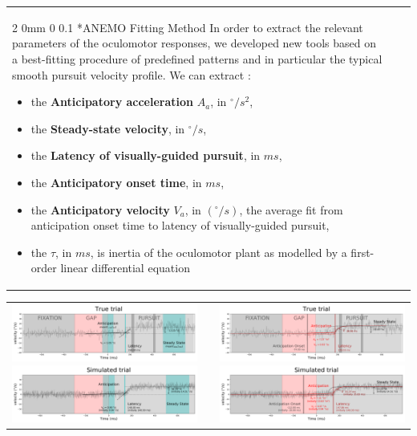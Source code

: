 \documentclass[profile,final,english, draft]{sciposter}%
\makeatletter
\renewcommand{\subsection}{\@startsection
        {subsection}%
        {2}%
        {0mm}%
        {0\baselineskip}%
        {0.1\baselineskip}%
        {\Large\color[rgb]{0.4,0,0}\bfseries}}%
\newcommand{\spacefig}{1.\baselineskip}
\makeatother
\begin{document}
\begin{tabular}{p{}m{}p{}}
\subsection*{ANEMO Fitting Method}
In order to extract the relevant parameters of the oculomotor responses, we developed new tools based on a best-fitting procedure of predefined patterns and in particular the typical smooth pursuit velocity profile. We can extract :
\begin{itemize}%
\item the \textbf{Anticipatory acceleration} $A_a$, in $^\circ/s^2$,
\item the \textbf{Steady-state velocity}, in $^\circ/s$,
\item the \textbf{Latency of visually-guided pursuit}, in $ms$,
\item the \textbf{Anticipatory onset time},  in $ms$,
\item the \textbf{Anticipatory velocity} $V_a$, in $(^\circ/s)$, the average fit from anticipation onset time to latency of visually-guided pursuit,
\item the \textbf{{\Large $\tau$}}, in $ms$, is inertia of the oculomotor plant as modelled by a first-order linear differential equation %
\end{itemize}
\end{tabular}

\vspace{-1\baselineskip}
\begin{tabular}{m{}m{}m{}} 
\includegraphics[width=0.455\columnwidth]{Old_methods_reel} %
\vspace{\spacefig}
\includegraphics[width=0.455\columnwidth]{Old_methods_simulation}
 &&
\includegraphics[width=0.455\columnwidth]{Fit_reel}
\vspace{\spacefig}
\includegraphics[width=0.455\columnwidth]{Fit_simulation}
\end{tabular}
\end{document}
